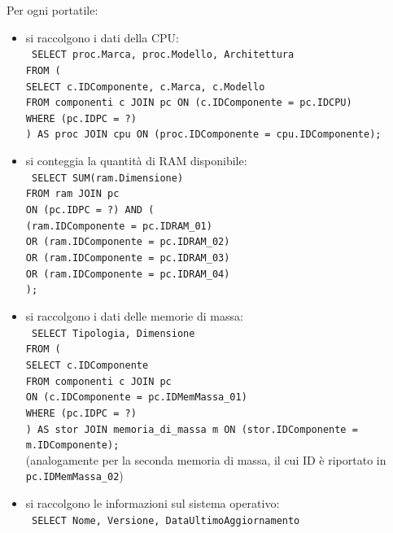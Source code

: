 \documentclass[a4paper,12pt]{report}
\begin{document}
\noindent Per ogni portatile:
\begin{itemize}[listparindent=\parindent]
    \item si raccolgono i dati della CPU: \\
    \texttt{
    SELECT proc.Marca, proc.Modello, Architettura \\
    FROM ( \\
        \indent \indent SELECT c.IDComponente, c.Marca, c.Modello \\
        \indent \indent FROM componenti c JOIN pc ON (c.IDComponente = pc.IDCPU) \\
        \indent \indent WHERE (pc.IDPC = ?) \\
    ) AS proc JOIN cpu ON (proc.IDComponente = cpu.IDComponente);
    }
    \item si conteggia la quantità di RAM disponibile: \\
    \texttt{
    SELECT SUM(ram.Dimensione) \\
    FROM ram JOIN pc \\
    ON (pc.IDPC = ?) AND ( \\
    \indent \indent (ram.IDComponente = pc.IDRAM\_01) \\
    \indent \indent OR (ram.IDComponente = pc.IDRAM\_02) \\
    \indent \indent OR (ram.IDComponente = pc.IDRAM\_03) \\
    \indent \indent OR (ram.IDComponente = pc.IDRAM\_04) \\
    );
    }
    \item si raccolgono i dati delle memorie di massa: \\
    \texttt{
    SELECT Tipologia, Dimensione \\
    FROM ( \\
    \indent \indent SELECT c.IDComponente \\
    \indent \indent FROM componenti c JOIN pc \\
    \indent \indent ON (c.IDComponente = pc.IDMemMassa\_01) \\ 
    \indent \indent WHERE (pc.IDPC = ?) \\
    ) AS stor JOIN memoria\_di\_massa m ON (stor.IDComponente = m.IDComponente);
    } \\
    (analogamente per la seconda memoria di massa, il cui ID è riportato in \texttt{pc.IDMemMassa\_02})
    \item si raccolgono le informazioni sul sistema operativo: \\
    \texttt{
    SELECT Nome, Versione, DataUltimoAggiornamento \\
}
\end{itemize}
\end{document}
